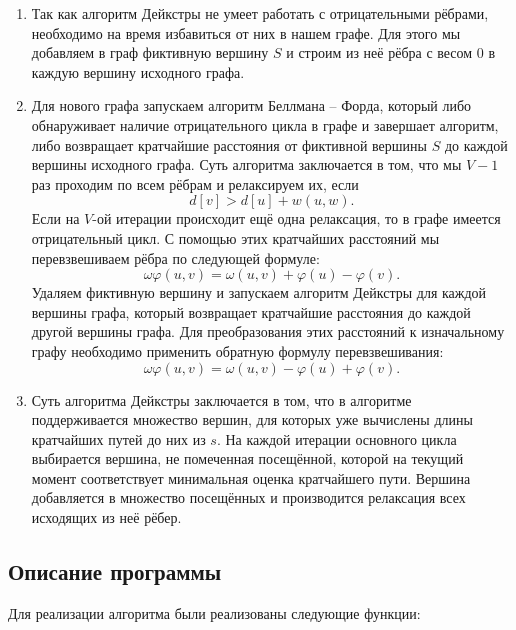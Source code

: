 \documentclass[12pt]{article}
\begin{document}
\begin{enumerate}
    \item Так как алгоритм Дейкстры не умеет работать с отрицательными рёбрами, необходимо на время избавиться от них в нашем графе. Для этого мы добавляем в граф фиктивную вершину \( S \) и строим из неё рёбра с весом \( 0 \) в каждую вершину исходного графа.
    
    \item Для нового графа запускаем алгоритм Беллмана -- Форда, который либо обнаруживает наличие отрицательного цикла в графе и завершает алгоритм, либо возвращает кратчайшие расстояния от фиктивной вершины \( S \) до каждой вершины исходного графа. Суть алгоритма заключается в том, что мы \( V - 1 \) раз проходим по всем рёбрам и релаксируем их, если 
    \[
    d[v] > d[u] + w(u, w).
    \]
    Если на \( V \)-ой итерации происходит ещё одна релаксация, то в графе имеется отрицательный цикл. С помощью этих кратчайших расстояний мы перевзвешиваем рёбра по следующей формуле:
    \[
    \omega\varphi(u, v) = \omega(u, v) + \varphi(u) - \varphi(v).
    \]
    Удаляем фиктивную вершину и запускаем алгоритм Дейкстры для каждой вершины графа, который возвращает кратчайшие расстояния до каждой другой вершины графа. Для преобразования этих расстояний к изначальному графу необходимо применить обратную формулу перевзвешивания:
    \[
    \omega\varphi(u, v) = \omega(u, v) - \varphi(u) + \varphi(v).
    \]
    
    \item Суть алгоритма Дейкстры заключается в том, что в алгоритме поддерживается множество вершин, для которых уже вычислены длины кратчайших путей до них из \( s \). На каждой итерации основного цикла выбирается вершина, не помеченная посещённой, которой на текущий момент соответствует минимальная оценка кратчайшего пути. Вершина добавляется в множество посещённых и производится релаксация всех исходящих из неё рёбер.
\end{enumerate}


\newpage
\subsection*{Описание программы}

Для реализации алгоритма были реализованы следующие функции:
\end{document}
